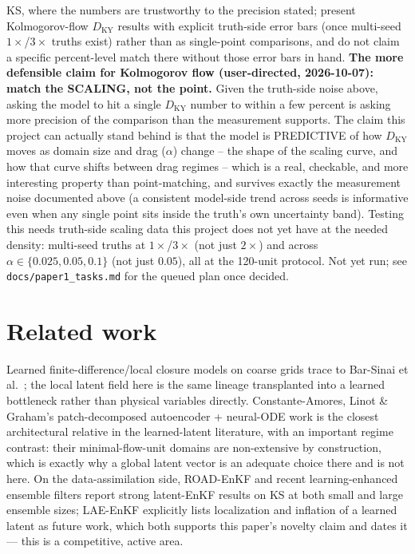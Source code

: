 \documentclass[11pt]{article}
\begin{document}
\begin{itemize}[nosep]
{  KS, where the numbers are trustworthy to the precision stated; present
  Kolmogorov-flow $D_{\mathrm{KY}}$ results with explicit truth-side
  error bars (once multi-seed $1\times$/$3\times$ truths exist) rather
  than as single-point comparisons, and do not claim a specific
  percent-level match there without those error bars in hand.}
\textbf{The more defensible claim for Kolmogorov flow (user-directed,
2026-10-07): match the SCALING, not the point.} Given the truth-side
noise above, asking the model to hit a single $D_{\mathrm{KY}}$ number
to within a few percent is asking more precision of the comparison than
the measurement supports. The claim this project can actually stand
behind is that the model is PREDICTIVE of how $D_{\mathrm{KY}}$ moves as
domain size and drag ($\alpha$) change -- the shape of the scaling
curve, and how that curve shifts between drag regimes -- which is a
real, checkable, and more interesting property than point-matching, and
survives exactly the measurement noise documented above (a consistent
model-side trend across seeds is informative even when any single point
sits inside the truth's own uncertainty band). Testing this needs
truth-side scaling data this project does not yet have at the needed
density: multi-seed truths at $1\times$/$3\times$ (not just $2\times$)
and across $\alpha\in\{0.025,0.05,0.1\}$ (not just $0.05$), all at the
120-unit protocol. Not yet run; see \texttt{docs/paper1\_tasks.md} for
the queued plan once decided.
\end{itemize}

\section{Related work}
\label{sec:related}

Learned finite-difference/local closure models on coarse grids trace to
Bar-Sinai et al.\ \cite{barsinai2019}; the local latent field here is
the same lineage transplanted into a learned bottleneck rather than
physical variables directly. Constante-Amores, Linot \& Graham's
patch-decomposed autoencoder + neural-ODE work
\cite{constanteamores2024,constanteamores2024b} is the closest
architectural relative in the learned-latent literature, with an
important regime contrast: their minimal-flow-unit domains are
non-extensive by construction, which is exactly why a global latent
vector is an adequate choice there and is not here. On the
data-assimilation side, ROAD-EnKF \cite{roadenkf} and recent
learning-enhanced ensemble filters \cite{learningensemblefilters}
report strong latent-EnKF results on KS at both small and large
ensemble sizes; LAE-EnKF \cite{laeenkf} explicitly lists localization
and inflation of a learned latent as future work, which both supports
this paper's novelty claim and dates it --- this is a competitive,
active area.
\end{document}
